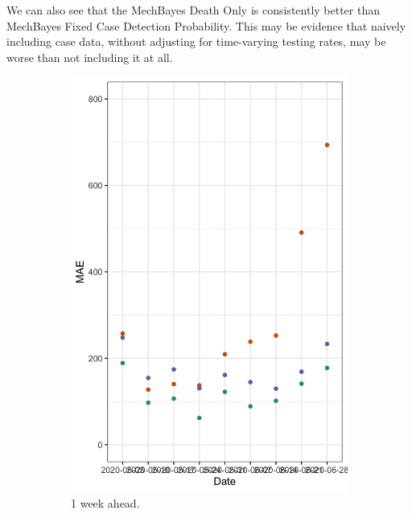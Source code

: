 \documentclass[11pt]{amsart}
\begin{document}
We can also see that the MechBayes Death Only is consistently better than MechBayes Fixed Case Detection Probability.  This may be evidence that naively including case data, without adjusting for time-varying testing rates, may be worse than not including it at all. 

\begin{figure}
  \centering
     \begin{subfigure}{.5\textwidth}
  \centering
    \includegraphics[scale=.15]{ablation_1.png}
    \caption{1 week ahead.}
\end{subfigure}%
\begin{subfigure}{.5\textwidth}
  \centering

\end{subfigure}
\end{figure}
\end{document}
